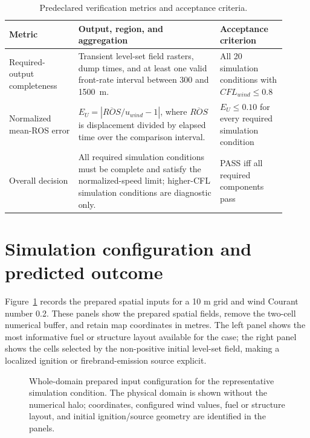 \begin{table}[H]
\centering
\footnotesize
\caption{Predeclared verification metrics and acceptance criteria.}
\label{tab:acceptance-contract}
\begin{tabular}{@{}p{0.23\linewidth}p{0.47\linewidth}p{0.21\linewidth}@{}}
\toprule
Metric & Output, region, and aggregation & Acceptance criterion\\
\midrule
Required-output completeness & Transient level-set field rasters, dump times, and at least one valid front-rate interval between 300 and \SI{1500}{m}. & All 20 simulation conditions with \(CFL_{wind}\le0.8\) \\
Normalized mean-ROS error & \(E_U=|\overline{ROS}/u_{wind}-1|\), where \(\overline{ROS}\) is displacement divided by elapsed time over the comparison interval. & \(E_U\le0.10\) for every required simulation condition \\
Overall decision & All required simulation conditions must be complete and satisfy the normalized-speed limit; higher-CFL simulation conditions are diagnostic only. & PASS iff all required components pass \\
\bottomrule
\end{tabular}
\end{table}

\section{Simulation configuration and predicted outcome}

Figure~\ref{fig:input-configuration} records the prepared spatial inputs for a 10 m grid and wind Courant number 0.2.
These panels show the prepared spatial fields, remove the
two-cell numerical buffer, and retain map coordinates in metres.  The left panel shows
the most informative fuel or structure layout available for the case; the right panel
shows the cells selected by the non-positive initial level-set field, making a localized
ignition or firebrand-emission source explicit.

\begin{figure}[H]
\centering
{}
\caption{Whole-domain prepared input configuration for the representative simulation condition.  The
physical domain is shown without the numerical halo; coordinates, configured wind values,
fuel or structure layout, and initial ignition/source geometry are identified in the panels.}
\label{fig:input-configuration}
\end{figure}

